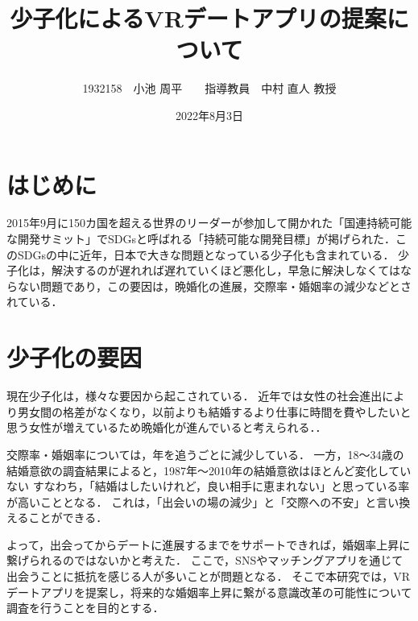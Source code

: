 \documentclass[12pt]{ltjsarticle}
\title{少子化によるVRデートアプリの提案について}
\author{1932158　小池 周平　　指導教員　中村 直人 教授}
\date{2022年8月3日}
\begin{document}
\maketitle

\section{はじめに}



2015年9月に150カ国を超える世界のリーダーが参加して開かれた「国連持続可能な開発サミット」でSDGsと呼ばれる「持続可能な開発目標」が掲げられた．このSDGsの中に近年，日本で大きな問題となっている少子化も含まれている．
少子化は，解決するのが遅れれば遅れていくほど悪化し，早急に解決しなくてはならない問題であり，この要因は，晩婚化の進展，交際率・婚姻率の減少などとされている．


\section{少子化の要因}
現在少子化は，様々な要因から起こされている． %
近年では女性の社会進出により男女間の格差がなくなり，以前よりも結婚するより仕事に時間を費やしたいと思う女性が増えているため晩婚化が進んでいると考えられる．\cite{sasaki2012}．

交際率・婚姻率については，年を追うごとに減少している．
一方，18〜34歳の結婚意欲の調査結果によると，1987年〜2010年の結婚意欲はほとんど変化していない
すなわち，「結婚はしたいけれど，良い相手に恵まれない」と思っている率が高いこととなる．
これは，「出会いの場の減少」と「交際への不安」と言い換えることができる．

よって，出会ってからデートに進展するまでをサポートできれば，婚姻率上昇に繋げられるのではないかと考えた．
ここで，SNSやマッチングアプリを通じて出会うことに抵抗を感じる人が多いことが問題となる．
そこで本研究では，VRデートアプリを提案し，将来的な婚姻率上昇に繋がる意識改革の可能性について調査を行うことを目的とする．
\end{document}
